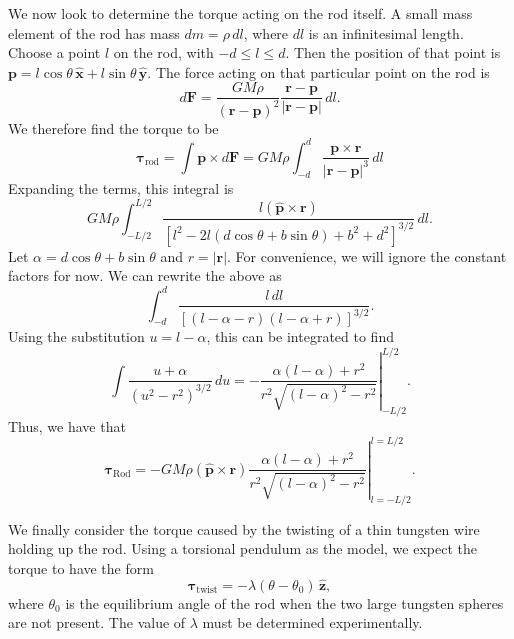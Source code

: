 \documentclass[aps, reprint,amsmath,amssymb]{revtex4-1} %
\renewcommand{\vec}[1]{\boldsymbol{#1}}
\newcommand{\uv}[1]{\vec{\hat{#1}}}
\newcommand{\x}{\vec{\hat{x}}}
\newcommand{\y}{\vec{\hat{y}}}
\newcommand{\z}{\vec{\hat{z}}}
\begin{document}
We now look to determine the torque acting on the rod itself. A small mass
element of the rod has mass $dm = \rho\,dl$, where $dl$ is an
infinitesimal length. Choose a point $l$ on the rod, with $-d\leq l \leq
d$. Then the position of that point is $\vec{p} = l\cos\theta\,\x +
l\sin\theta\,\y$. The force acting on that particular point on the rod is
\[
    d\vec{F} = \frac{G M \rho}{(\vec{r} - \vec{p})^2} \frac{\vec{r} -
    \vec{p}}{|\vec{r} - \vec{p}|} \, dl.
\]
We therefore find the torque to be
\begin{equation}
    \label{eq:almost_rod_torque}
    \vec{\tau}_\text{rod} = \int \vec{p} \times d\vec{F}
    = G M \rho \int_{-d}^d \frac{\vec{p}\times\vec{r}}{|\vec{r} -
    \vec{p}|^3} \, dl
\end{equation}
Expanding the terms, this integral is
\[
    G M \rho \int_{-L/2}^{L/2} \frac{l (\uv{p} \times \vec{r}) }
{[l^2 - 2l (d \cos \theta + b \sin \theta) + b^2 + d^2]^{3/2}}\, dl.
\]
Let $\alpha = d \cos \theta + b \sin \theta$ and $r = |\vec{r}|$.
For convenience, we will ignore the constant factors for now. 
We can rewrite the above as
\[
    \int_{-d}^{d} \frac{l\,dl}
    {[ (l - \alpha - r) (l - \alpha + r)]^{3/2}}.
\]
Using the substitution $u = l - \alpha$, this can be integrated to
find
\[
    \int \frac{u + \alpha}{(u^2 - r^2)^{3/2}}\,du
    = -\left.\frac{\alpha (l-\alpha) + r^2}
    {r^2 \sqrt{(l-\alpha)^2 - r^2}} \right|_{-L/2}^{L/2}.
\]
Thus, we have that
\begin{equation}\label{eq:rod_torque}
    \vec{\tau}_\text{Rod} = - G M \rho (\uv{p}\times\vec{r}) 
    \left.
    \frac{\alpha (l - \alpha) + r^2}
    {r^2 \sqrt{(l-\alpha)^2 - r^2}}
    \right|_{l=-L/2}^{l = L/2}.
\end{equation}

We finally consider the torque caused by the twisting of a thin tungsten
wire holding up the rod. Using a torsional pendulum as the model, we expect
the torque to have the form
\begin{equation}
    \label{eq:torsional_pendulum}
    \vec{\tau}_\text{twist} = - \lambda (\theta - \theta_0) \,\z,
\end{equation}
where $\theta_0$ is the equilibrium angle of the rod when the two large
tungsten spheres are not present. The value of $\lambda$ must be determined
experimentally. 
\end{document}
